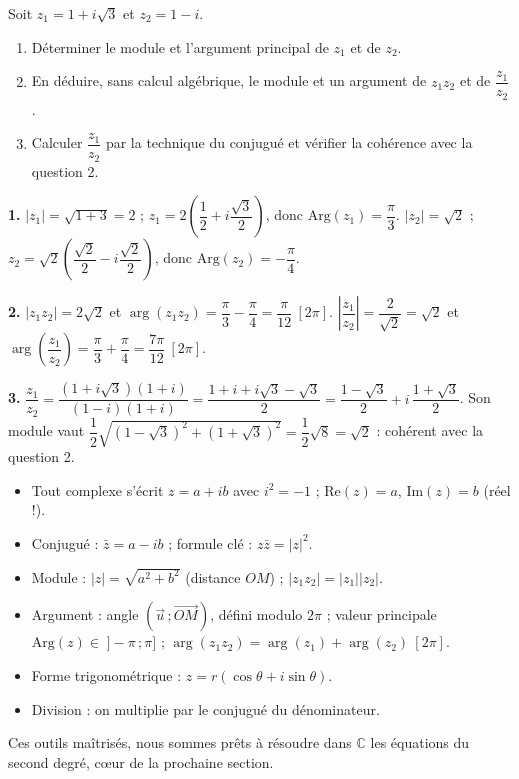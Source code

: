 \documentclass[11pt]{article}
\begin{document}
\begin{exercice}
Soit $z_1 = 1 + i\sqrt{3}$ et $z_2 = 1 - i$.
\begin{enumerate}
\item Déterminer le module et l'argument principal de $z_1$ et de $z_2$.
\item En déduire, sans calcul algébrique, le module et un argument de $z_1 z_2$ et de $\dfrac{z_1}{z_2}$.
\item Calculer $\dfrac{z_1}{z_2}$ par la technique du conjugué et vérifier la cohérence avec la question 2.
\end{enumerate}
\end{exercice}

\begin{corrige}[Exercice 1]
\textbf{1.} $|z_1| = \sqrt{1 + 3} = 2$ ; $z_1 = 2\left(\dfrac{1}{2} + i\dfrac{\sqrt{3}}{2}\right)$, donc $\mathrm{Arg}(z_1) = \dfrac{\pi}{3}$. $|z_2| = \sqrt{2}$ ; $z_2 = \sqrt{2}\left(\dfrac{\sqrt{2}}{2} - i\dfrac{\sqrt{2}}{2}\right)$, donc $\mathrm{Arg}(z_2) = -\dfrac{\pi}{4}$.

\textbf{2.} $|z_1 z_2| = 2\sqrt{2}$ et $\arg(z_1 z_2) = \dfrac{\pi}{3} - \dfrac{\pi}{4} = \dfrac{\pi}{12} \ [2\pi]$. $\left|\dfrac{z_1}{z_2}\right| = \dfrac{2}{\sqrt{2}} = \sqrt{2}$ et $\arg\left(\dfrac{z_1}{z_2}\right) = \dfrac{\pi}{3} + \dfrac{\pi}{4} = \dfrac{7\pi}{12} \ [2\pi]$.

\textbf{3.} $\dfrac{z_1}{z_2} = \dfrac{(1+i\sqrt{3})(1+i)}{(1-i)(1+i)} = \dfrac{1 + i + i\sqrt{3} - \sqrt{3}}{2} = \dfrac{1-\sqrt{3}}{2} + i\,\dfrac{1+\sqrt{3}}{2}$. Son module vaut $\dfrac{1}{2}\sqrt{(1-\sqrt{3})^2 + (1+\sqrt{3})^2} = \dfrac{1}{2}\sqrt{8} = \sqrt{2}$ : cohérent avec la question 2.
\end{corrige}

\begin{aretenir}
\begin{itemize}
\item Tout complexe s'écrit $z = a + ib$ avec $i^2 = -1$ ; $\mathrm{Re}(z) = a$, $\mathrm{Im}(z) = b$ (réel !).
\item Conjugué : $\bar{z} = a - ib$ ; formule clé : $z\bar{z} = |z|^2$.
\item Module : $|z| = \sqrt{a^2+b^2}$ (distance $OM$) ; $|z_1 z_2| = |z_1||z_2|$.
\item Argument : angle $(\vec{u}\,;\overrightarrow{OM})$, défini modulo $2\pi$ ; valeur principale $\mathrm{Arg}(z) \in \; ]-\pi\,;\pi]$ ; $\arg(z_1 z_2) = \arg(z_1) + \arg(z_2) \ [2\pi]$.
\item Forme trigonométrique : $z = r(\cos\theta + i\sin\theta)$.
\item Division : on multiplie par le conjugué du dénominateur.
\end{itemize}
Ces outils maîtrisés, nous sommes prêts à résoudre dans $\mathbb{C}$ les équations du second degré, cœur de la prochaine section.
\end{aretenir}
\end{document}
